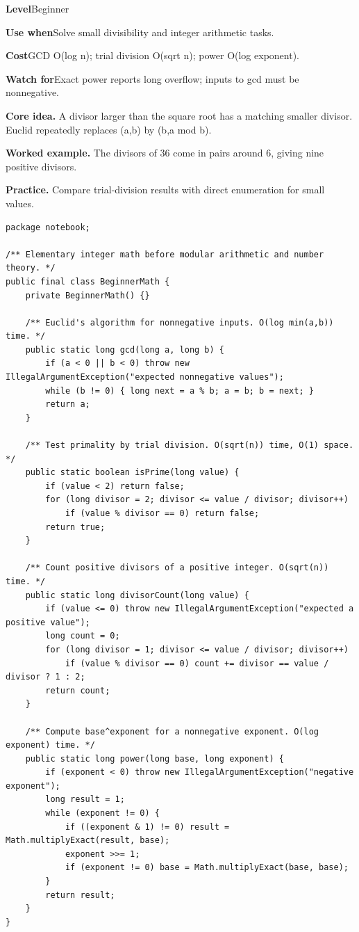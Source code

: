 \documentclass[10pt,letterpaper]{article}
\newcommand{\entrylabel}[1]{\textcolor{accent}{\bfseries #1}}
\begin{document}
\begin{guidebox}\small
\entrylabel{Level}\quad Beginner\par
\entrylabel{Use when}\quad Solve small divisibility and integer arithmetic tasks.\par
\entrylabel{Cost}\quad GCD O(log n); trial division O(sqrt n); power O(log exponent).\par
\entrylabel{Watch for}\quad Exact power reports long overflow; inputs to gcd must be nonnegative.\par
\end{guidebox}
\noindent\textbf{Core idea.} A divisor larger than the square root has a matching smaller divisor. Euclid repeatedly replaces (a,b) by (b,a mod b).\par
\noindent\textbf{Worked example.} The divisors of 36 come in pairs around 6, giving nine positive divisors.\par
\noindent\textbf{Practice.} Compare trial-division results with direct enumeration for small values.\par
\begin{lstlisting}
package notebook;

/** Elementary integer math before modular arithmetic and number theory. */
public final class BeginnerMath {
    private BeginnerMath() {}

    /** Euclid's algorithm for nonnegative inputs. O(log min(a,b)) time. */
    public static long gcd(long a, long b) {
        if (a < 0 || b < 0) throw new IllegalArgumentException("expected nonnegative values");
        while (b != 0) { long next = a % b; a = b; b = next; }
        return a;
    }

    /** Test primality by trial division. O(sqrt(n)) time, O(1) space. */
    public static boolean isPrime(long value) {
        if (value < 2) return false;
        for (long divisor = 2; divisor <= value / divisor; divisor++)
            if (value % divisor == 0) return false;
        return true;
    }

    /** Count positive divisors of a positive integer. O(sqrt(n)) time. */
    public static long divisorCount(long value) {
        if (value <= 0) throw new IllegalArgumentException("expected a positive value");
        long count = 0;
        for (long divisor = 1; divisor <= value / divisor; divisor++)
            if (value % divisor == 0) count += divisor == value / divisor ? 1 : 2;
        return count;
    }

    /** Compute base^exponent for a nonnegative exponent. O(log exponent) time. */
    public static long power(long base, long exponent) {
        if (exponent < 0) throw new IllegalArgumentException("negative exponent");
        long result = 1;
        while (exponent != 0) {
            if ((exponent & 1) != 0) result = Math.multiplyExact(result, base);
            exponent >>= 1;
            if (exponent != 0) base = Math.multiplyExact(base, base);
        }
        return result;
    }
}
\end{lstlisting}
\end{document}
